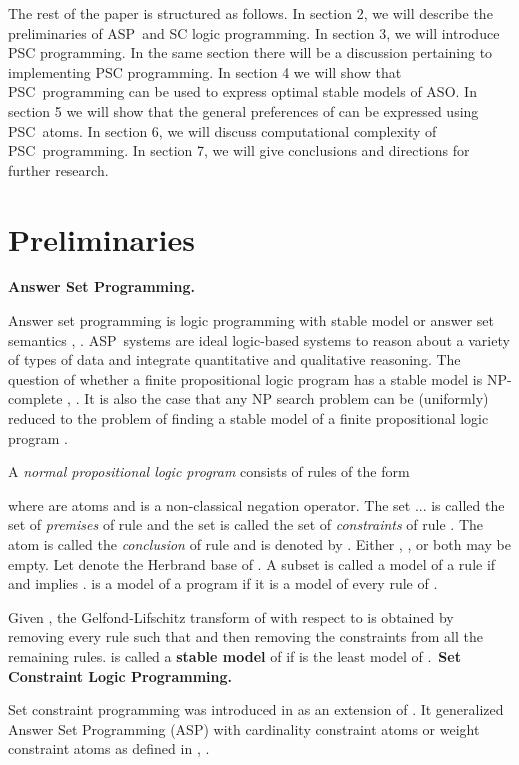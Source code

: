 \documentclass[letterpaper]{article}\usepackage{aaai}
\begin{document}
The rest of the paper is structured as follows. In section 2, we will describe
the preliminaries of ASP\ and SC logic programming. In section 3, we will
introduce PSC programming. In the same section there will be a discussion
pertaining to implementing PSC programming. In section 4 we will show that
PSC\ programming can be used to express optimal stable models of ASO. In
section 5 we will show that the general preferences of \cite{SP} can be
expressed using PSC\ atoms. In section 6, we will discuss computational
complexity of PSC\ programming. In section 7, we will give conclusions and
directions for further research.

\section{Preliminaries}

\noindent\textbf{Answer Set Programming.}

Answer set programming is logic programming with stable model or answer set
semantics \cite{GL}, \cite{GL91}. ASP\ systems are ideal logic-based systems
to reason about a variety of types of data and integrate quantitative and
qualitative reasoning. The question of whether a finite propositional logic
program has a stable model is NP-complete \cite{Elkan}, \cite{MT}. It is also
the case that any NP search problem can be (uniformly) reduced to the problem
of finding a stable model of a finite propositional logic program \cite{MR2}.

A \emph{normal propositional logic program}  consists of rules of the form

where  are atoms and  is a
non-classical negation operator. The set ... is called the set of \textit{premises} of rule  and the set
 is called the set of
\textit{constraints} of rule . The atom  is called the
\textit{conclusion} of rule  and is denoted by .
Either , , or both may be empty. Let  denote the
Herbrand base of . A subset  is called a model of a rule
 if  and  implies .
 is a model of a program  if it is a model of every rule of .

Given , the Gelfond-Lifschitz transform  of  with
respect to  is obtained by removing every rule  such that  and then removing the constraints from all the
remaining rules.  is called a \textbf{stable model }of  if  is the
least model of .\newline\ \newline\textbf{Set Constraint Logic
Programming.}

Set constraint programming was introduced in \cite{MR} as an extension of
. It generalized Answer Set Programming (ASP) with
cardinality constraint atoms or weight constraint atoms as defined in
\cite{NSS99}, \cite{NS00}.
\end{document}
